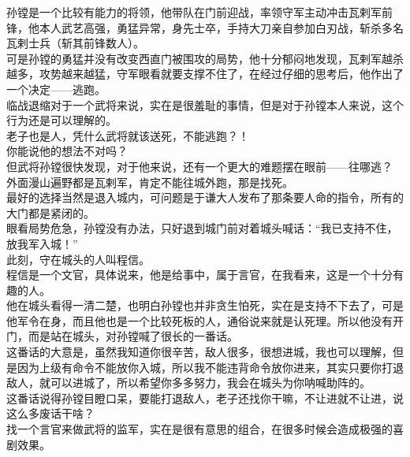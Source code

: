 \begin{multicols}{\theparacolNo}
孙镗是一个比较有能力的将领，他带队在门前迎战，率领守军主动冲击瓦剌军前锋，他本人武艺高强，勇猛异常，身先士卒，手持大刀亲自参加白刃战，斩杀多名瓦剌士兵（斩其前锋数人）。\\

可是孙镗的勇猛并没有改变西直门被围攻的局势，他十分郁闷地发现，瓦剌军越杀越多，攻势越来越猛，守军眼看就要支撑不住了，在经过仔细的思考后，他作出了一个决定——逃跑。\\

临战退缩对于一个武将来说，实在是很羞耻的事情，但是对于孙镗本人来说，这个行为还是可以理解的。\\

老子也是人，凭什么武将就该送死，不能逃跑？！\\

你能说他的想法不对吗？\\

但武将孙镗很快发现，对于他来说，还有一个更大的难题摆在眼前——往哪逃？\\

外面漫山遍野都是瓦剌军，肯定不能往城外跑，那是找死。\\

最好的选择当然是退入城内，可问题是于谦大人发布了那条要人命的指令，所有的大门都是紧闭的。\\

眼看局势危急，孙镗没有办法，只好退到城门前对着城头喊话：“我已支持不住，放我军入城！”\\

此刻，守在城头的人叫程信。\\

程信是一个文官，具体说来，他是给事中，属于言官，在我看来，这是一个十分有趣的人。\\

他在城头看得一清二楚，也明白孙镗也并非贪生怕死，实在是支持不下去了，可是他军令在身，而且他也是一个比较死板的人，通俗说来就是认死理。所以他没有开门，而是站在城头，对孙镗喊了很长的一番话。\\

这番话的大意是，虽然我知道你很辛苦，敌人很多，很想进城，我也可以理解，但是因为上级有命令不能放你入城，所以我不能违背命令放你进来，其实只要你打退敌人，就可以进城了，所以希望你多多努力，我会在城头为你呐喊助阵的。\\

这番话说得孙镗目瞪口呆，要能打退敌人，老子还找你干嘛，不让进就不让进，说这么多废话干啥？\\

找一个言官来做武将的监军，实在是很有意思的组合，在很多时候会造成极强的喜剧效果。\\


\end{multicols}
